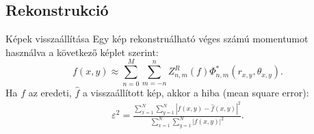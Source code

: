 \documentclass{beamer}
\begin{document}

\subsection{Rekonstrukció}
\begin{frame}{Képek visszaállítása}
\vskip 10mm
Egy kép rekonstruálható véges számú momentumot használva a következő képlet szerint:
$$
f(x,y) \approx \sum_{n=0}^{M}\sum_{m=-n}^{n}Z_{n,m}^R(f)\Phi_{n,m}^*(r_{x,y},\theta_{x,y}).
$$
Ha $f$ az eredeti, $\widehat{f}$ a visszaállított kép, akkor a hiba (mean square error):
\begin{gather*}
    \varepsilon^2 = \frac{\displaystyle \sum_{x=1}^N\sum_{y=1}^N \left|f(x,y) - \widehat{f}(x,y)\right|^2}{\displaystyle \sum_{x=1}^N\sum_{y=1}^N \left|f(x,y)\right|^2}.
\end{gather*}
\end{frame}
\end{document}
